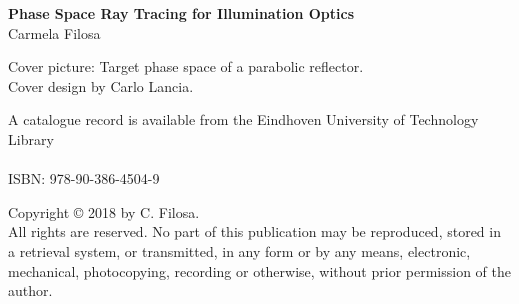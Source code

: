 
\thispagestyle{plain}

\vspace*{4cm}

\begin{center}
{\Huge \textbf{Phase Space Ray Tracing for Illumination Optics}}\\
\vspace{1cm}
{\huge{Carmela Filosa}}
\end{center}



\clearpage
\thispagestyle{plain}

\vspace*{\fill}



\noindent Cover picture: Target phase space of a parabolic reflector. \\
Cover design by Carlo Lancia. 

\vspace{1cm}

\noindent A catalogue record is available from the Eindhoven University of Technology Library\\
\\
\noindent ISBN:  978-90-386-4504-9\\

\vspace{1cm}

\noindent Copyright \copyright{} 2018 by C. Filosa. \\
All rights are reserved. No part of this publication may be reproduced, stored in a retrieval system, or transmitted, in any form or by any means, electronic, mechanical, photocopying, recording or otherwise, without prior permission of the author.

\clearpage


\thispagestyle{plain}

